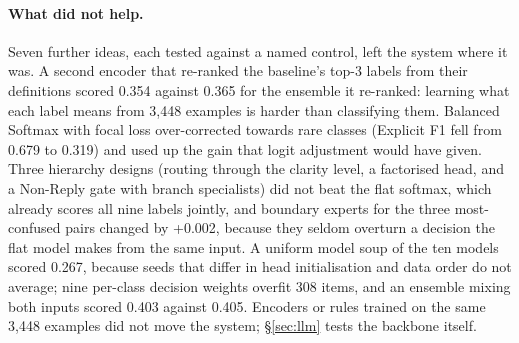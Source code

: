 \paragraph{What did not help.}
Seven further ideas, each tested against a named control, left the system where it was.
A second encoder that re-ranked the baseline's top-3 labels from their definitions scored
0.354 against 0.365 for the ensemble it re-ranked: learning what each label means from
3,448 examples is harder than classifying them. Balanced Softmax with focal loss
\citep{ren2020balanced,lin2017focal} over-corrected towards rare classes (Explicit F1
fell from 0.679 to 0.319) and used up the gain that logit adjustment would have given.
Three hierarchy designs (routing through the clarity level, a factorised head, and a
Non-Reply gate with branch specialists) did not beat the flat softmax, which already
scores all nine labels jointly, and boundary experts for the three most-confused pairs
changed \Stwo{} by +0.002, because they seldom overturn a decision the flat model makes
from the same input. A uniform model soup of the ten models scored 0.267, because seeds
that differ in head initialisation and data order do not average; nine per-class
decision weights overfit 308 items, and an ensemble mixing both inputs scored 0.403
against 0.405. Encoders or
rules trained on the same 3,448 examples did not move the system; \S\ref{sec:llm} tests
the backbone itself.
